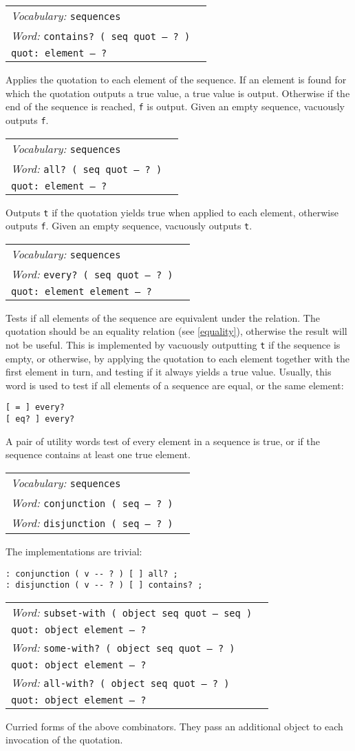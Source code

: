 \documentclass{book}
\newcommand{\vocabulary}[1]{\emph{Vocabulary:} \texttt{#1}&\\}
\newcommand{\ordinaryword}[2]{\index{\texttt{#1}}\emph{Word:} \texttt{#2}&\\}
\newcommand{\wordtable}[1]{


\begin{tabularx}{12cm}{lX}
\hline
#1
\hline
\end{tabularx}

}
\begin{document}
\wordtable{
\vocabulary{sequences}
\ordinaryword{contains?}{contains?~( seq quot -- ?~)}
\texttt{quot:~element -- ?}\\
}
Applies the quotation to each element of the sequence. If an element is found for which the quotation outputs a true value, a true value is output. Otherwise if the end of the sequence is reached, \verb|f| is output. Given an empty sequence, vacuously outputs \texttt{f}.
\wordtable{
\vocabulary{sequences}
\ordinaryword{all?}{all?~( seq quot -- ?~)}
\texttt{quot:~element -- ?}\\
}
Outputs \texttt{t} if the quotation yields true when applied to each element, otherwise outputs \texttt{f}. Given an empty sequence, vacuously outputs \texttt{t}.
\wordtable{
\vocabulary{sequences}
\ordinaryword{every?}{every?~( seq quot -- ?~)}
\texttt{quot:~element element -- ?}\\
}
Tests if all elements of the sequence are equivalent under the relation. The quotation should be an equality relation (see \ref{equality}), otherwise the result will not be useful. This is implemented by vacuously outputting \verb|t| if the sequence is empty, or otherwise, by applying the quotation to each element together with the first element in turn, and testing if it always yields a true value. Usually, this word is used to test if all elements of a sequence are equal, or the same element:
\begin{verbatim}
[ = ] every?
[ eq? ] every?
\end{verbatim}

A pair of utility words test of every element in a sequence is true, or if the sequence contains at least one true element.
\wordtable{
\vocabulary{sequences}
\ordinaryword{conjunction}{conjunction~( seq -- ?~)}
\ordinaryword{disjunction}{disjunction~( seq -- ?~)}
}
The implementations are trivial:
\begin{verbatim}
: conjunction ( v -- ? ) [ ] all? ;
: disjunction ( v -- ? ) [ ] contains? ;
\end{verbatim}

\wordtable{
\ordinaryword{subset-with}{subset-with ( object seq quot -- seq )}
\texttt{quot:~object element -- ?}\\
\ordinaryword{some-with?}{some-with?~( object seq quot -- ?~)}
\texttt{quot:~object element -- ?}\\
\ordinaryword{all-with?}{all-with?~( object seq quot -- ?~)}
\texttt{quot:~object element -- ?}\\
}
Curried forms of the above combinators. They pass an additional object to each invocation of the quotation.
\end{document}
